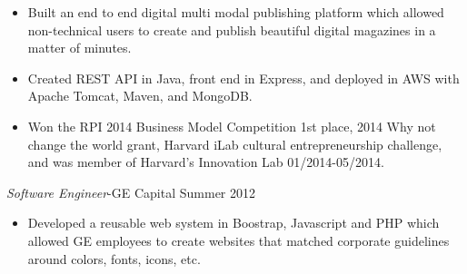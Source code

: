 \documentclass[line,margin]{res}
\begin{document}
\begin{resume}
\begin{itemize}  \itemsep -4pt
\item Built an end to end digital multi modal publishing platform which allowed non-technical users to create and publish beautiful digital magazines in a matter of minutes.
\item Created REST API in Java, front end in Express, and deployed in AWS with Apache Tomcat, Maven, and MongoDB.
\item Won the RPI 2014 Business Model Competition 1st place, 2014 Why not change the world grant, Harvard iLab cultural entrepreneurship challenge, and was member of Harvard's Innovation Lab 01/2014-05/2014.
\end{itemize}
{\sl Software Engineer}-GE Capital \hfill Summer 2012
\begin{itemize}  \itemsep -4pt
\item Developed a reusable web system in Boostrap, Javascript and PHP which allowed GE employees to create websites that matched corporate guidelines around colors, fonts, icons, etc.
\end{itemize}
\end{resume}
\end{document}
